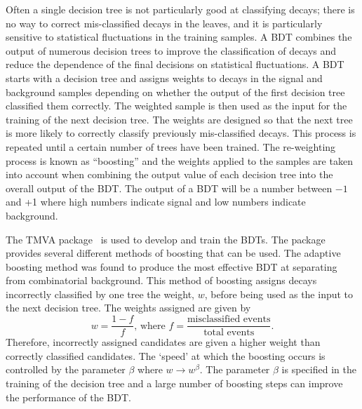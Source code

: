 Often a single decision tree is not particularly good at classifying decays; there is no way to correct mis-classified decays in the leaves, and it is particularly sensitive to statistical fluctuations in the training samples. A BDT combines the output of numerous decision trees to improve the classification of decays and reduce the dependence of the final decisions on statistical fluctuations. A BDT starts with a decision tree and assigns weights to decays in the signal and background samples depending on whether the output of the first decision tree classified them correctly. The weighted sample is then used as the input for the training of the next decision tree. The weights are designed so that the next tree is more likely to correctly classify previously mis-classified decays. This process is repeated until a certain number of trees have been trained. The re-weighting process is known as ``boosting'' and the weights applied to the samples are taken into account when combining the output value of each decision tree into the overall output of the BDT. The output of a BDT will be a number between $-1$ and +1 where high numbers indicate signal and low numbers indicate background.


The TMVA package~\cite{Hocker:2007ht} is used to develop and train the BDTs. The package provides several different methods of boosting that can be used. The adaptive boosting method was found to produce the most effective BDT at separating \bmumu from combinatorial background.
This method of boosting assigns decays incorrectly classified by one tree the weight, $w$, before being used as the input to the next decision tree. The weights assigned are given by
\begin{equation}
w = \frac{1 - f}{f}\text{, where } f = \frac{\text{misclassified events}}{\text{total events}}.
\end{equation}
Therefore, incorrectly assigned candidates are given a higher weight than correctly classified candidates. The `speed’ at which the boosting occurs is controlled by the parameter $\beta$ where $w \rightarrow w^{\beta}$. The parameter $\beta$ is specified in the training of the decision tree and a large number of boosting steps can improve the performance of the BDT.

